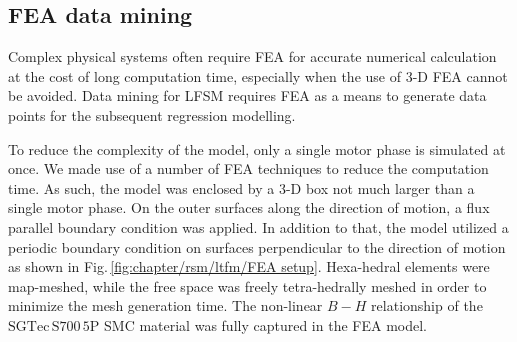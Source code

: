         \subsection{\acs{FEA} data mining}          \label{Chapter:RSM/LTFM/data mining}
        
        
            Complex physical systems often require \acs{FEA} for accurate numerical calculation at the cost of long computation time, especially when the use of 3-D \acs{FEA} cannot be avoided. Data mining for \acs{LFSM} requires FEA as a means to generate data points for the subsequent regression modelling. 
            
            
            To reduce the complexity of the model, only a single motor phase is simulated at once. We made use of a number of \acs{FEA} techniques to reduce the computation time. As such, the model was enclosed by a 3-D box not much larger than a single motor phase. On the outer surfaces along the direction of motion, a flux parallel boundary condition was applied. In addition to that, the model utilized a periodic boundary condition on surfaces perpendicular to the direction of motion as shown in Fig.\,\ref{fig:chapter/rsm/ltfm/FEA setup}. Hexa-hedral elements were map-meshed, while the free space was freely tetra-hedrally meshed in order to minimize the mesh generation time. The non-linear $B-H$ relationship of the $\mathrm{SGTec\,S700\,5P}$ \acs{SMC} material was fully captured in the \acs{FEA} model. 
            
